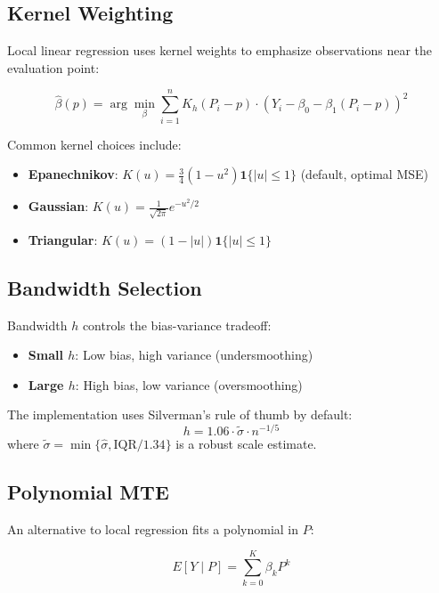 \subsection{Kernel Weighting}

Local linear regression uses kernel weights to emphasize observations near the evaluation point:

\begin{equation}
\hat{\beta}(p) = \arg\min_{\beta} \sum_{i=1}^n K_h(P_i - p) \cdot (Y_i - \beta_0 - \beta_1(P_i - p))^2
\end{equation}

Common kernel choices include:

\begin{itemize}
\item \textbf{Epanechnikov}: $K(u) = \frac{3}{4}(1 - u^2)\mathbf{1}\{|u| \leq 1\}$ (default, optimal MSE)
\item \textbf{Gaussian}: $K(u) = \frac{1}{\sqrt{2\pi}}e^{-u^2/2}$
\item \textbf{Triangular}: $K(u) = (1 - |u|)\mathbf{1}\{|u| \leq 1\}$
\end{itemize}

\subsection{Bandwidth Selection}

Bandwidth $h$ controls the bias-variance tradeoff:

\begin{itemize}
\item \textbf{Small $h$}: Low bias, high variance (undersmoothing)
\item \textbf{Large $h$}: High bias, low variance (oversmoothing)
\end{itemize}

The implementation uses Silverman's rule of thumb by default:
\begin{equation}
h = 1.06 \cdot \tilde{\sigma} \cdot n^{-1/5}
\end{equation}
where $\tilde{\sigma} = \min\{\hat{\sigma}, \text{IQR}/1.34\}$ is a robust scale estimate.

\subsection{Polynomial MTE}

An alternative to local regression fits a polynomial in $P$:

\begin{equation}
E[Y \mid P] = \sum_{k=0}^K \beta_k P^k
\end{equation}

